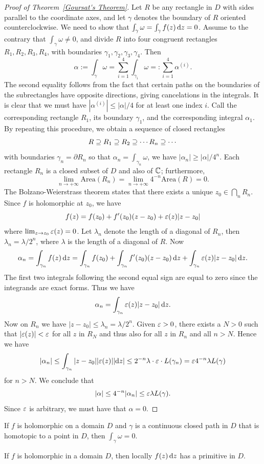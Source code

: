\begin{proof}[Proof of Theorem~\ref{Goursat's Theorem}]
Let $R$ be any rectangle in $D$ with sides parallel to the coordinate axes, and let $\gamma$ denotes the boundary of $R$ oriented counterclockwise. We need to show that $\int_{\gamma}\omega=\int_{\gamma}f(z)\mathop{}\!\mathrm{d} z=0$. Assume to the contrary that $\int_{\gamma}\omega\neq 0$, and divide $R$ into four congruent rectangles $R_1,R_2,R_3,R_4$, with boundaries $\gamma_1,\gamma_2,\gamma_3,\gamma_4$. Then
\[\alpha:=\int_{\gamma}\omega=\sum_{i=1}^{4}\int_{\gamma_i}\omega=:\sum_{i=1}^{4}\alpha^{(i)}.\]
The second equality follows from the fact that certain paths on the boundaries of the subrectangles have opposite directions, giving cancelations in the integrals. It is clear that we must have $|\alpha^{(i)}|\leq|\alpha|/4$ for at least one index $i$. Call the corresponding rectangle $R_1$, its boundary $\gamma_1$, and the corresponding integral $\alpha_1$. By repeating this procedure, we obtain a sequence of closed rectangles
\[R\supseteq R_1\supseteq R_2\supseteq\cdots R_n\supseteq\cdots\]
with boundaries $\gamma_n=\partial R_n$ so that $\alpha_n=\int_{\gamma_n}\omega$, we have $|\alpha_n|\geq|\alpha|/4^n$. Each rectangle $R_n$ is a closed subset of $D$ and also of $\mathbb{C}$; furthermore,
\[\lim_{n\to+\infty}\mathrm{Area}(R_n)=\lim_{n\to+\infty}4^{-n}\mathrm{Area}(R)=0.\]
The Bolzano-Weierstrass theorem states that there exists a unique $z_0\in\bigcap_nR_n$. Since $f$ is holomorphic at $z_0$, we have
\[f(z)=f(z_0)+f'(z_0)(z-z_0)+\varepsilon(z)|z-z_0|\]
where $\lim_{z\to z_0}\varepsilon(z)=0$. Let $\lambda_n$ denote the length of a diagonal of $R_n$, then $\lambda_n=\lambda/2^n$, where $\lambda$ is the length of a diagonal of $R$. Now
\[\alpha_n=\int_{\gamma_n}f(z)\mathop{}\!\mathrm{d} z=\int_{\gamma_n}f(z_0)+\int_{\gamma_n}f'(z_0)(z-z_0)\mathop{}\!\mathrm{d} z+\int_{\gamma_n}\varepsilon(z)|z-z_0|\mathop{}\!\mathrm{d} z.\]
The first two integrals following the second equal sign are equal to zero since the integrands are exact forms. Thus we have
\[\alpha_n=\int_{\gamma_n}\varepsilon(z)|z-z_0|\mathop{}\!\mathrm{d} z.\]
Now on $R_n$ we have $|z-z_0|\leq\lambda_n=\lambda/2^n$. Given $\varepsilon>0$, there exists a $N>0$ such that $|\varepsilon(z)|<\varepsilon$ for all $z$ in $R_N$ and thus also for all $z$ in $R_n$ and all $n>N$. Hence we have
\[|\alpha_n|\leq\int_{\gamma_n}|z-z_0||\varepsilon(z)||\mathrm{d}z|\leq 2^{-n}\lambda\cdot\varepsilon\cdot L(\gamma_n)=\varepsilon 4^{-n}\lambda L(\gamma)\]
for $n>N$. We conclude that
\[|\alpha|\leq 4^{-n}|\alpha_n|\leq\varepsilon\lambda L(\gamma).\]
Since $\varepsilon$ is arbitrary, we must have that $\alpha=0$.
\end{proof}
\begin{corollary}
If $f$ is holomorphic on a domain $D$ and $\gamma$ is a continuous closed path in $D$ that is homotopic to a point in $D$, then $\int_{\gamma}\omega=0$.
\end{corollary}
\begin{corollary}
If $f$ is holomorphic in a domain $D$, then locally $f(z)\mathop{}\!\mathrm{d} z$ has a primitive in $D$.
\end{corollary}

